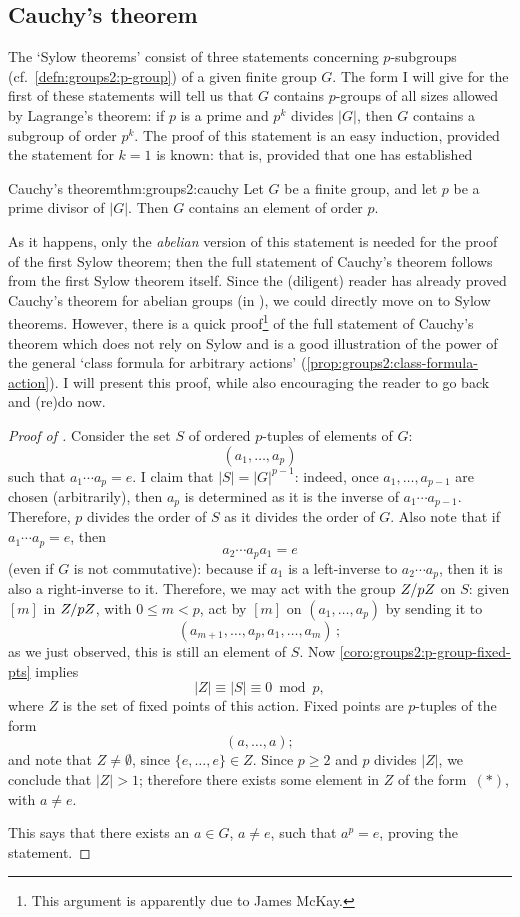 \subsection{Cauchy's theorem}
\label{subsec:groups2:cauchy-s-theorem}
The `Sylow theorems' consist of three statements concerning
$p$-subgroups (cf.\ \cref{defn:groups2:p-group}) of a given finite
group $G$. The form I will give for the first of these statements will
tell us that $G$ contains $p$-groups of all sizes allowed by
Lagrange's theorem: if $p$ is a prime and $p^k$ divides $|G|$, then
$G$ contains a subgroup of order $p^k$. The proof of this statement is
an easy induction, provided the statement for $k = 1$ is known: that
is, provided that one has established
\begin{thm}{Cauchy's theorem}{thm:groups2:cauchy}
  Let $G$ be a finite group, and let $p$ be a prime divisor of
  $|G|$. Then $G$ contains an element of order $p$.
\end{thm}
As it happens, only the \emph{abelian} version of this statement is
needed for the proof of the first Sylow theorem; then the full
statement of Cauchy's theorem follows from the first Sylow theorem
itself. Since the (diligent) reader has already proved Cauchy's
theorem for abelian groups (in ), we
could directly move on to Sylow theorems.  However, there is a quick
proof\footnote{This argument is apparently due to James McKay.} of the
full statement of Cauchy's theorem which does not rely on Sylow and is
a good illustration of the power of the general `class formula for
arbitrary actions' (\cref{prop:groups2:class-formula-action}). I will
present this proof, while also encouraging the reader to go back and
(re)do  now.
\begin{proof}[Proof of ]
  Consider the set $S$ of ordered $p$-tuples of elements of $G$:
  \[
    (a_1, \dots, a_p)
  \]
  such that $a_1 \cdots a_p = e$. I claim that $|S| = |G|^{p-1}$:
  indeed, once $a_1, \dots, a_{p-1}$ are chosen (arbitrarily), then
  $a_p$ is determined as it is the inverse of $a_1 \cdots
  a_{p-1}$. Therefore, $p$ divides the order of $S$ as it divides the
  order of $G$.  Also note that if $a_1 \cdots a_p = e$, then
  \[
    a_2 \cdots a_p a_1 = e
  \]
  (even if $G$ is not commutative): because if $a_1$ is a left-inverse
  to $a_2 \cdots a_p$, then it is also a right-inverse to it.
  Therefore, we may act with the group $Z/pZ$ on $S$: given $[m]$ in
  $Z/pZ$, with $0 \leq m < p$, act by $[m]$ on $(a_1, \dots, a_p)$
  by sending it to
  \[
    (a_{m+1}, \dots, a_p, a_1, \dots, a_m)\,;
  \]
  as we just observed, this is still an element of $S$.  Now
  \cref{coro:groups2:p-group-fixed-pts} implies
  \[
    |Z| \equiv |S| \equiv 0 \bmod p,
  \]
  where $Z$ is the set of fixed points of this action. Fixed points
  are $p$-tuples of the form
  \[
    \tag{$*$} (a, \dots, a);
  \]
  and note that $Z \neq \emptyset$, since $\{e, \dots, e\} \in
  Z$. Since $p \geq 2$ and $p$ divides $|Z|$, we conclude that
  $|Z| > 1$; therefore there exists some element in $Z$ of the
  form~$(*)$, with $a \neq e$.

  This says that there exists an $a \in G$, $a \neq e$, such that
  $a^p = e$, proving the statement.
\end{proof}
